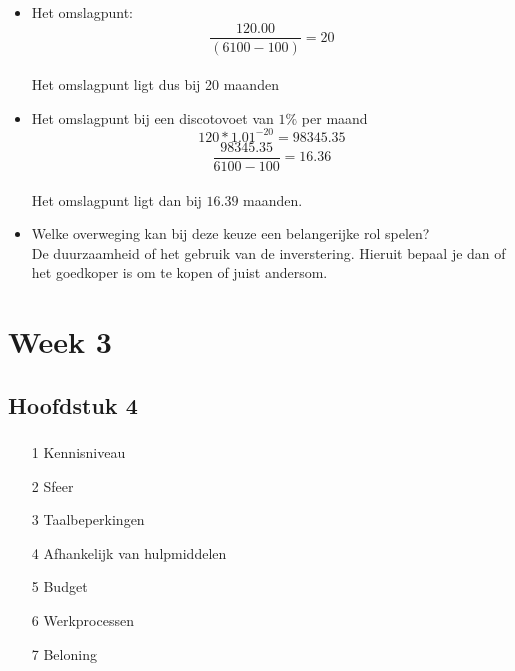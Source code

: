 \documentclass[a4paper,titlepage]{artikel1}
\begin{document}
   \subsubsection[Opdracht 5]{}
    \begin{itemize}
     \item Het omslagpunt:
	   \begin{displaymath}
	    \frac{120.00}{(6100-100)}=20
	   \end{displaymath}
	   \\Het omslagpunt ligt dus bij 20 maanden
     \item Het omslagpunt bij een discotovoet van $1\%$ per maand
	   \begin{displaymath}
	    120*1.01^{-20}=98345.35
	   \end{displaymath}
	   \begin{displaymath}
	    \frac{98345.35}{6100-100}=16.36
	   \end{displaymath}
	   \\Het omslagpunt ligt dan bij $16.39$ maanden.
     \item Welke overweging kan bij deze keuze een belangerijke rol spelen?\\De duurzaamheid of het gebruik van de inverstering. Hieruit bepaal je dan of het goedkoper is om te kopen of juist andersom.
    \end{itemize}
    
 \section{Week 3}
  \subsection{Hoofdstuk 4}
   \subsubsection[Opdracht 1]{}
   \begin{itemize}
    \item[1] Kennisniveau
    \item[2] Sfeer
    \item[3] Taalbeperkingen
    \item[4] Afhankelijk van hulpmiddelen
    \item[5] Budget
    \item[6] Werkprocessen
    \item[7] Beloning
   \end{itemize}
   
\end{document}
